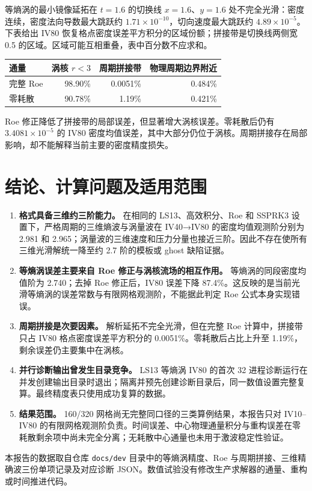 \documentclass[
  a4paper,
]{ctexart}
\providecommand{\tightlist}{%
  \setlength{\itemsep}{0pt}\setlength{\parskip}{0pt}}
\begin{document}
等熵涡的最小镜像延拓在 \(t=1.6\) 的切换线 \(x=1.6\)、\(y=1.6\)
处不完全光滑：密度连续，密度法向导数最大跳跃约
\(1.71\times10^{-10}\)，切向速度最大跳跃约
\(4.89\times10^{-5}\)。下表给出 IV80
恢复格点密度误差平方积分的区域份额；拼接带是切换线两侧宽 0.5
的区域。区域可能互相重叠，表中百分数不应求和。

\begin{longtable}[]{@{}lrrr@{}}
\toprule\noalign{}
通量 & 涡核 \(r<3\) & 周期拼接带 & 物理周期边界附近 \\
\midrule\noalign{}
\endhead
\bottomrule\noalign{}
\endlastfoot
完整 Roe & 98.90\% & 0.0051\% & 0.484\% \\
零耗散 & 90.78\% & 1.19\% & 0.421\% \\
\end{longtable}

Roe 修正降低了拼接带的局部误差，但显著增大涡核误差。零耗散后仍有
\(3.4081\times10^{-5}\) 的 IV80
密度均值误差，其中大部分仍位于涡核。周期拼接存在局部影响，却不能解释当前主要的密度精度损失。

\hypertarget{ux7ed3ux8bbaux8ba1ux7b97ux95eeux9898ux53caux9002ux7528ux8303ux56f4}{%
\section{结论、计算问题及适用范围}\label{ux7ed3ux8bbaux8ba1ux7b97ux95eeux9898ux53caux9002ux7528ux8303ux56f4}}

\begin{enumerate}
\def\labelenumi{\arabic{enumi}.}
\tightlist
\item
  \textbf{格式具备三维约三阶能力。} 在相同的 LS13、高效积分、Roe 和
  SSPRK3 设置下，严格周期的三维熵波与涡量波在 IV40→IV80
  的密度均值观测阶分别为 2.981 和
  2.965；涡量波的三维速度和压力分量也接近三阶。因此不存在使所有三维光滑解统一降至约
  2.7 阶的模板或 ghost 缺陷证据。
\item
  \textbf{等熵涡误差主要来自 Roe 修正与涡核流场的相互作用。}
  等熵涡的同段密度均值阶为 2.740；去掉 Roe 修正后，IV80 误差下降
  87.4\%。这反映的是当前光滑等熵涡的误差常数与有限网格观测阶，不能据此判定
  Roe 公式本身实现错误。
\item
  \textbf{周期拼接是次要因素。} 解析延拓不完全光滑，但在完整 Roe
  计算中，拼接带只占 IV80 格点密度误差平方积分的
  0.0051\%。零耗散后占比上升至 1.19\%，剩余误差仍主要集中在涡核。
\item
  \textbf{并行诊断输出曾发生目录竞争。} LS13 等熵涡 IV80 的首次 32
  进程诊断运行在并发创建输出目录时退出；隔离并预先创建诊断目录后，同一数值设置完整复算。最终精度表只使用成功复算的数据。
\item
  \textbf{结果范围。} 160/320
  网格尚无完整同口径的三类算例结果，本报告只对 IV10--IV80
  的有限网格观测阶负责。时间误差、中心物理通量积分与重构误差在零耗散剩余项中尚未完全分离；无耗散中心通量也未用于激波稳定性验证。
\end{enumerate}

本报告的数据取自仓库 \texttt{docs/dev} 目录中的等熵涡精度、Roe
与周期拼接、三维精确波三份单项记录及对应诊断
JSON。数值试验没有修改生产求解器的通量、重构或时间推进代码。
\end{document}
